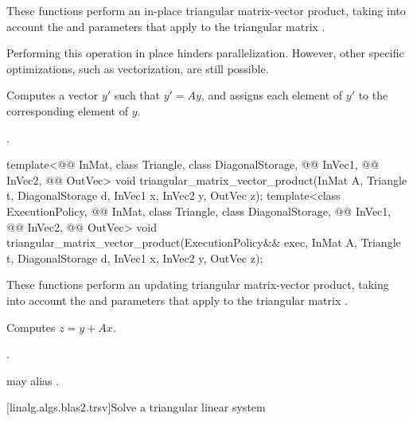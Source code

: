 \begin{itemdescr}

\pnum
These functions perform an in-place triangular matrix-vector product,
taking into account the  and  parameters
that apply to the triangular matrix .
\begin{note}
Performing this operation in place hinders parallelization.
However, other  specific optimizations,
such as vectorization, are still possible.
\end{note}

\pnum
\effects
Computes a vector $y'$ such that $y' = A y$,
and assigns each element of $y'$ to the corresponding element of $y$.

\pnum
\complexity
{}.
\end{itemdescr}

\begin{itemdecl}
template<@@ InMat, class Triangle, class DiagonalStorage,
         @@ InVec1, @@ InVec2, @@ OutVec>
  void triangular_matrix_vector_product(InMat A, Triangle t, DiagonalStorage d,
                                        InVec1 x, InVec2 y, OutVec z);
template<class ExecutionPolicy, @@ InMat, class Triangle, class DiagonalStorage,
         @@ InVec1, @@ InVec2, @@ OutVec>
  void triangular_matrix_vector_product(ExecutionPolicy&& exec,
                                        InMat A, Triangle t, DiagonalStorage d,
                                        InVec1 x, InVec2 y, OutVec z);
\end{itemdecl}

\begin{itemdescr}
\pnum
These functions perform an updating triangular matrix-vector product,
taking into account the  and  parameters
that apply to the triangular matrix .

\pnum
\effects
Computes $z = y + A x$.

\pnum
\complexity
{}.

\pnum
\remarks
{} may alias .
\end{itemdescr}

[linalg.algs.blas2.trsv]{Solve a triangular linear system}

